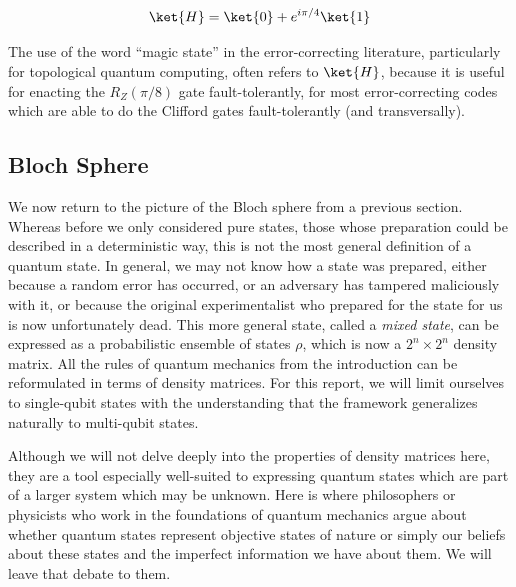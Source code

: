 \begin{equation}
\ket{H} = \ket{0} + e^{i\pi/4} \ket{1}
\end{equation}

The use of the word ``magic state'' in the error-correcting literature,
particularly for topological quantum computing, often refers to $\ket{H}$,
because it is useful for enacting the $R_Z(\pi/8)$ gate fault-tolerantly,
for most error-correcting codes which are able to do
the Clifford gates fault-tolerantly (and transversally).


\subsection{Bloch Sphere}

We now return to the picture of the Bloch sphere from a previous section.
Whereas before we only considered pure states, those whose preparation could
be described in a deterministic way, this is not the most general definition
of a quantum state. In general, we may not know how a state was prepared,
either because a random error has occurred, or an adversary has tampered
maliciously with it, or because the original experimentalist who prepared
for the state for us is now unfortunately dead. This more general state,
called a \emph{mixed state}, can be expressed as a probabilistic ensemble of
states $\rho$, which is now a $2^n \times 2^n$ density matrix. All the
rules of quantum mechanics from the introduction can be reformulated in
terms of density matrices. For this report,
we will limit ourselves to single-qubit states with the understanding that
the framework generalizes naturally to multi-qubit states.

Although we
will not delve deeply into the properties of density matrices here, they are
a tool especially well-suited to expressing quantum states which are part
of a larger system which may be unknown. Here is where philosophers or
physicists who work in the foundations of quantum mechanics argue about whether
quantum states represent objective states of nature or simply our beliefs about
these states and the imperfect information we have about them. We will leave
that debate to them.

